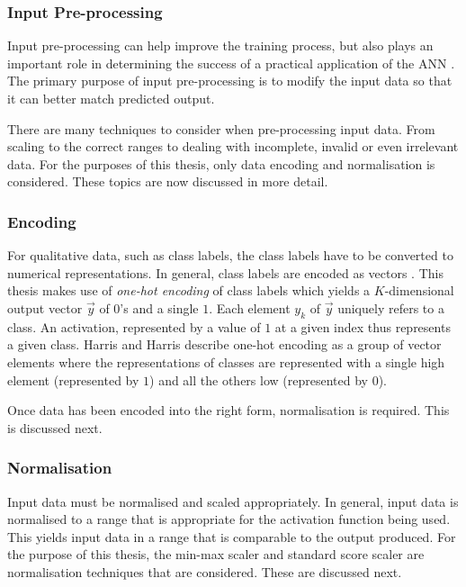 \subsubsection{Input Pre-processing}
\label{sec:anns:an:input:input_pre_processing}

Input pre-processing can help improve the training process, but also plays an
important role in determining the success of a practical application of the
\ac{ANN} \cite{ref:kuzniar:2017}. The primary purpose of input
pre-processing is to modify the input data so that it can better match predicted
output. 

There are many techniques to consider when pre-processing input data. From
scaling to the correct ranges to dealing with incomplete, invalid or even
irrelevant data. For the purposes of this thesis, only data encoding and
normalisation is considered. These topics are now discussed in more detail.


\subsubsection{Encoding}
\label{sec:anns:an:input:encoding}

For qualitative data, such as class labels, the class labels have to be
converted to numerical representations. In general, class labels are encoded as
vectors \cite{ref:srinidhi:2018, ref:brownlee:2017:one-hot}. This thesis makes
use of \textit{one-hot encoding} of class labels which
yields a $K$-dimensional output vector $\vec{y}$ of $0$'s and a single $1$. Each
element $y_k$ of $\vec{y}$ uniquely refers to a class. An activation, represented by a value
of $1$ at a given index thus represents a given class. Harris and Harris
\cite{ref:harris:2010} describe one-hot encoding as a
group of vector elements where the representations of classes are represented
with a single high element (represented by $1$) and all the others low
(represented by $0$).

Once data has been encoded into the right form, normalisation is required. This
is discussed next.


\subsubsection{Normalisation}
\label{sec:anns:an:input:normalisation}

Input data must be normalised and scaled appropriately. In general, input data
is normalised to a range that is appropriate for the activation function being used. This yields input data in a range that
is comparable to the output produced. For the purpose of this thesis, the
min-max scaler \cite{ref:al:2006} and standard score scaler \cite{ref:jain:2005}
are normalisation techniques that are considered. These are discussed next.

